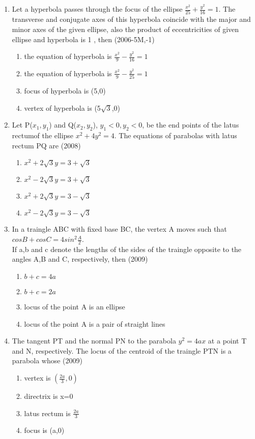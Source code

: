 \documentclass[journal,12pt,twocolumn]{IEEEtran}
\theoremstyle{remark}
\begin{document}
\begin{enumerate}
\item Let a hyperbola passes through the focus of the ellipse \textbf{$\frac{x^2}{25}+\frac{y^2}{16}=1$}. The transverse and conjugate axes of this hyperbola coincide with the major and minor axes of the given ellipse, also the product of eccentricities of given ellipse and hyperbola is 1 , then \hfill (2006-5M,-1)\\
	\begin{enumerate}
		\item the equation of hyperbola is $\frac{x^2}{9}-\frac{y^2}{16}=1$
		\item the equation of hyperbola is $\frac{x^2}{9}-\frac{y^2}{25}=1$
		\item focus of hyperbola is (5,0)
		\item vertex of hyperbola is (5$\sqrt{3}$,0)
	\end{enumerate}

\item Let P($x_{1},y_{1}$) and Q($x_{2},y_{2}$), $y_{1}<0,y_{2}<0$, be the end points of the latus rectumof the ellipse $x^2+4y^2=4$. The equations of parabolas with latus rectum PQ are \hfill(2008)\\
	\begin{enumerate}
		\item $x^2+2\sqrt{3}y=3+\sqrt{3}$
		\item $x^2-2\sqrt{3}y=3+\sqrt{3}$
		\item $x^2+2\sqrt{3}y=3-\sqrt{3}$
		\item $x^2-2\sqrt{3}y=3-\sqrt{3}$
	\end{enumerate}

\item In a traingle ABC with fixed base BC, the vertex A moves such that\\
	\hspace{1.5cm}$cosB+cosC=4sin^2\frac{A}{2}$.\\
		If a,b and c denote the lengths of the sides of the traingle opposite to the angles A,B and C, respectively, then \hfill(2009)\\
		\begin{enumerate}
			\item $b+c=4a$
			\item $b+c=2a$
			\item locus of the point A is an ellipse
			\item locus of the point A is a pair of straight lines
		\end{enumerate}

	\item The tangent PT and the normal PN to the parabola $y^2=4ax$ at a point T and N, respectively. The locus of the centroid of the traingle PTN is a parabola whose \hfill(2009)\\
		\begin{enumerate}
			\item vertex is $\left(\frac{2a}{3},0\right)$
			\item directrix is x=0
			\item latus rectum is $\frac{2a}{3}$
			\item focus is (a,0)
		\end{enumerate}


\end{enumerate}
\end{document}
